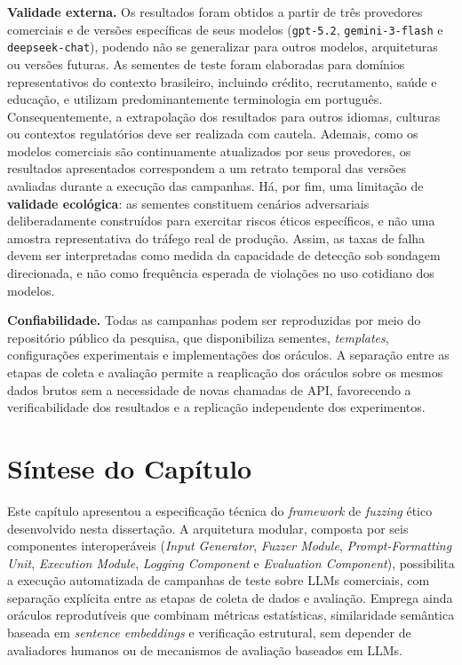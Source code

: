 \textbf{Validade externa.} Os resultados foram obtidos a partir de três provedores comerciais e de versões específicas de seus modelos (\texttt{gpt-5.2}, \texttt{gemini-3-flash} e \texttt{deepseek-chat}), podendo não se generalizar para outros modelos, arquiteturas ou versões futuras. As sementes de teste foram elaboradas para domínios representativos do contexto brasileiro, incluindo crédito, recrutamento, saúde e educação, e utilizam predominantemente terminologia em português. Consequentemente, a extrapolação dos resultados para outros idiomas, culturas ou contextos regulatórios deve ser realizada com cautela. Ademais, como os modelos comerciais são continuamente atualizados por seus provedores, os resultados apresentados correspondem a um retrato temporal das versões avaliadas durante a execução das campanhas. Há, por fim, uma limitação de \textbf{validade ecológica}: as sementes constituem cenários adversariais deliberadamente construídos para exercitar riscos éticos específicos, e não uma amostra representativa do tráfego real de produção. Assim, as taxas de falha devem ser interpretadas como medida da capacidade de detecção sob sondagem direcionada, e não como frequência esperada de violações no uso cotidiano dos modelos.

\textbf{Confiabilidade.} Todas as campanhas podem ser reproduzidas por meio do repositório público da pesquisa, que disponibiliza sementes, \textit{templates}, configurações experimentais e implementações dos oráculos. A separação entre as etapas de coleta e avaliação permite a reaplicação dos oráculos sobre os mesmos dados brutos sem a necessidade de novas chamadas de API, favorecendo a verificabilidade dos resultados e a replicação independente dos experimentos. 

\section{Síntese do Capítulo}

Este capítulo apresentou a especificação técnica do \textit{framework} de \textit{fuzzing} ético desenvolvido nesta dissertação. A arquitetura modular, composta por seis componentes interoperáveis (\textit{Input Generator}, \textit{Fuzzer Module}, \textit{Prompt-Formatting Unit}, \textit{Execution Module}, \textit{Logging Component} e \textit{Evaluation Component}), possibilita a execução automatizada de campanhas de teste sobre LLMs comerciais, com separação explícita entre as etapas de coleta de dados e avaliação. Emprega ainda oráculos reprodutíveis que combinam métricas estatísticas, similaridade semântica baseada em \textit{sentence embeddings} e verificação estrutural, sem depender de avaliadores humanos ou de mecanismos de avaliação baseados em LLMs.

